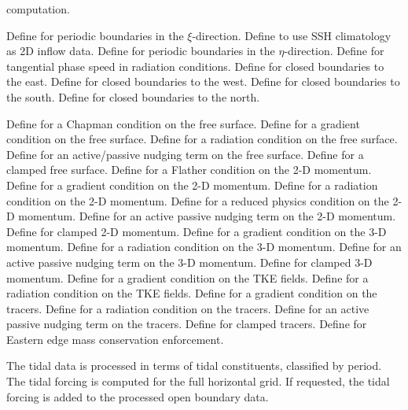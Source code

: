 \begin{klist}
\begin{klist}
	computation.
      \end{klist}
   \mbox{}
  \begin{klist}
       Define for periodic boundaries in the
   $\xi$-direction.
           Define to use SSH climatology as 2D inflow
   data.
       Define for periodic boundaries in the
   $\eta$-direction.
       Define for tangential phase speed in
     radiation conditions.
       Define for closed boundaries to the east.
       Define for closed boundaries to the west.
       Define for closed boundaries to the south.
       Define for closed boundaries to the north.
  \end{klist}
   \mbox{}
  \begin{klist}
       Define for a Chapman
   condition on the free surface.
       Define for a gradient
   condition on the free surface.
       Define for a radiation
   condition on the free surface.
       Define for an active/passive nudging term
   on the free surface.
       Define for a clamped free surface.
       Define for a Flather
   condition on the 2-D momentum.
       Define for a gradient
   condition on the 2-D momentum.
       Define for a radiation
   condition on the 2-D momentum.
       Define for a reduced physics
   condition on the 2-D momentum.
       Define for an active passive nudging term
   on the 2-D momentum.
       Define for clamped 2-D momentum.
       Define for a gradient
   condition on the 3-D momentum.
       Define for a radiation
   condition on the 3-D momentum.
       Define for an active passive nudging term
   on the 3-D momentum.
       Define for clamped 3-D momentum.
       Define for a gradient
   condition on the TKE fields.
       Define for a radiation
   condition on the TKE fields.
       Define for a gradient
   condition on the tracers.
       Define for a radiation
   condition on the tracers.
       Define for an active passive nudging term
   on the tracers.
       Define for clamped tracers.
       Define for Eastern edge mass conservation
   enforcement.
  \end{klist}
   \mbox{}
The tidal data is processed in terms of tidal constituents, classified by
period. The tidal forcing is computed for the full horizontal grid.
If requested, the tidal forcing is added to the processed open
boundary data.


\end{klist}
